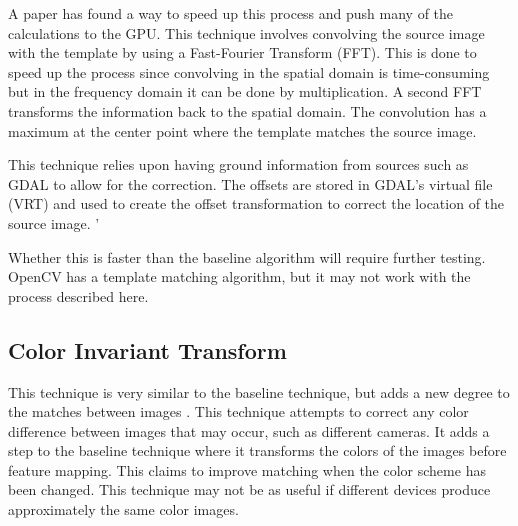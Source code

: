 \documentclass[12pt]{article} %
\begin{document}
	A paper \cite{rs5094488} has found a way to speed up this process and push many of the calculations to the GPU. This technique involves convolving the source image with the template by using a Fast-Fourier Transform (FFT). This is done to speed up the process since convolving in the spatial domain is time-consuming but in the frequency domain it can be done by multiplication. A second FFT transforms the information back to the spatial domain. The convolution has a maximum at the center point where the template matches the source image. 
	
	This technique relies upon having ground information from sources such as GDAL to allow for the correction. The offsets are stored in GDAL's virtual file (VRT) and used to create the offset transformation to correct the location of the source image. '
		
	Whether this is faster than the baseline algorithm will require further testing. OpenCV has a template matching algorithm, but it may not work with the process described here.

\subsection{Color Invariant Transform}
	This technique is very similar to the baseline technique, but adds a new degree to the matches between images \cite{Setkov:2013:CIF:2466715.2466731}. This technique attempts to correct any color difference between images that may occur, such as different cameras. It adds a step to the baseline technique where it transforms the colors of the images before feature mapping. This claims to improve matching when the color scheme has been changed. This technique may not be as useful if different devices produce approximately the same color images.
	
\end{document}
